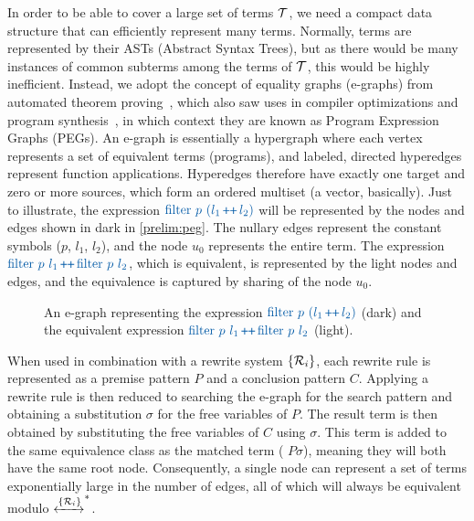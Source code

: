 In order to be able to cover a large set of terms $\mathcal{T}$, we need a
compact data structure that can efficiently represent many terms.
Normally, terms are represented by their ASTs
(Abstract Syntax Trees), but as there would
be many instances of common subterms among the terms of $\mathcal{T}$, 
this would be highly inefficient.
Instead, we adopt the concept of equality graphs (e-graphs) from automated theorem proving~\cite{JACM2005:Detlefs},
which also saw uses in compiler optimizations and program synthesis~\cite{POPL2009:Tate,herbie,PLDI2020:Nandi}, in which context they are known as Program Expression Graphs (PEGs).
An e-graph is essentially a hypergraph where each vertex represents a set
of equivalent terms (programs), and labeled, directed hyperedges
represent function applications.
Hyperedges therefore have exactly one target and zero or more sources,
which form an ordered multiset (a vector, basically).
Just to illustrate, the expression
$\clrterm\tfilter~p~(l_1 \concat l_2)$
will be represented by the nodes and edges shown in dark in \autoref{prelim:peg}.
The nullary edges represent the constant symbols ($p$, $l_1$, $l_2$), and the node $u_0$ represents the entire term.
The expression 
$\clrterm\textrm{filter}~p~l_1 \concat \textrm{filter}~p~l_2$, which is equivalent, is represented by the light nodes and edges, and the equivalence is captured by sharing of the node $u_0$.

\begin{comment}
\[
\begin{array}{l}
    \langle \rangle \xrightarrow{p} u_1 \quad
    \langle \rangle \xrightarrow{l_1} u_2 \quad
    \langle \rangle \xrightarrow{l_2} u_3 \qquad
    \langle u_2, u_3 \rangle \xrightarrow{\concat} u_4 \quad
    \langle u_1, u_4 \rangle \xrightarrow{\textrm{filter}} u_5
\end{array}
\]
\end{comment}

\begin{SCfigure}[1.18][t]
\scalebox{.9}{

}
\caption{An e-graph representing the expression
$\clrterm\textrm{filter}~p~(l_1 \concat l_2)$ (dark)
and the equivalent expression
$\clrterm\textrm{filter}~p~l_1 \concat \textrm{filter}~p~l_2$ (light).}
\label{prelim:peg}
\end{SCfigure}

When used in combination with a rewrite system $\{\mathcal{R}_i\}$, each
rewrite rule is represented as a premise pattern $P$ and a conclusion pattern $C$.
Applying a rewrite rule is then reduced to searching the e-graph for the search pattern and obtaining a substitution $\sigma$ for the free variables of $P$.
The result term is then obtained by substituting the free variables of $C$ using $\sigma$.
This term is added to the same equivalence class as the matched term (\ie{} $P\sigma$), meaning they will both have the same root node.
Consequently, a single node can represent a set of terms
exponentially large in the number of edges, all of which will always be equivalent modulo 
$\xleftrightarrow[]{\{\mathcal{R}_i\}}^*$.


